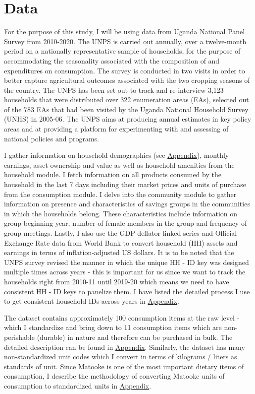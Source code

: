 \documentclass[12pt]{article}
\begin{document}
{\section{Data}\label{sec:2.a Data} 
\hspace{1cm} For the purpose of this study, I will be using data from Uganda National Panel Survey from 2010-2020. The UNPS is carried out annually, over a twelve-month period on a nationally representative sample of households, for the purpose of accommodating the seasonality associated with the composition of and expenditures on consumption. The survey is conducted in two visits in order to better capture agricultural outcomes associated with the two cropping seasons of the country. The UNPS has been set out to track and re-interview 3,123 households that were distributed over 322 enumeration areas (EAs), selected out of the 783 EAs that had been visited by the Uganda National Household Survey (UNHS) in 2005-06. The UNPS aims at producing annual estimates in key policy areas and at providing a platform for experimenting with and assessing of national policies and programs. 

\hspace{1cm} I gather information on household demographics (see \hyperref[sec:appendix]{Appendix}), monthly earnings, asset ownership and value as well as household amenities from the household module. I fetch information on all products consumed by the household in the last 7 days including their market prices and units of purchase from the consumption module. I delve into the community module to gather information on presence and characteristics of savings groups in the communities in which the households belong. These characteristics include information on group beginning year, number of female members in the group and frequency of group
meetings. Lastly, I also use the GDP deflator linked series and Official Exchange Rate data from World Bank to convert household (HH) assets and earnings in terms of inflation-adjusted US dollars. It is to be noted that the UNPS survey revised the manner in which the unique HH - ID key was designed multiple times across years - this is important for us since we want to track the households right from 2010-11 until 2019-20 which means we need to have consistent HH - ID keys to panelize them. I have listed the detailed process I use to get consistent household IDs across years in \hyperref[sec:appendix]{Appendix}.

\hspace{1cm} The dataset contains approximately 100 consumption items at the raw level - which I standardize and bring down to 11 consumption items which are non-perishable (durable) in nature and therefore can be purchased in bulk. The detailed description can be found in \hyperref[sec:appendix]{Appendix}. Similarly, the dataset has many non-standardized unit codes which I convert in terms of kilograms / liters as standards of unit. Since Matooke is one of the most important dietary items of consumption, I describe the methodology of converting Matooke units of consumption to standardized units in \hyperref[sec:appendix]{Appendix}. 

}
\end{document}
